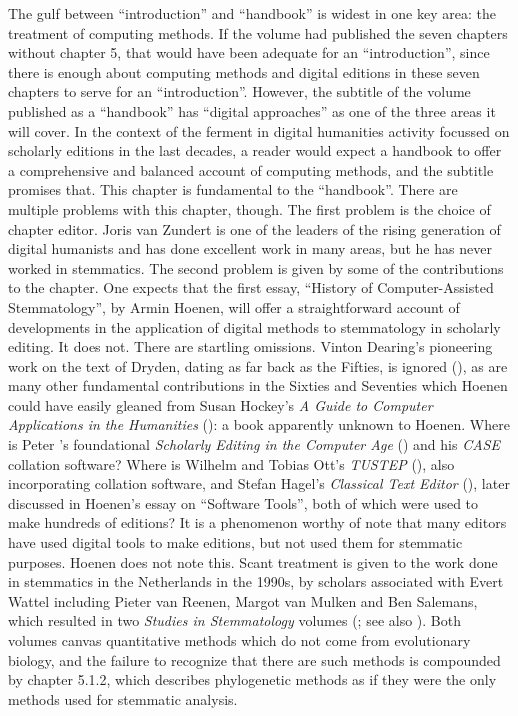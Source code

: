 \begin{review}
The gulf between ``introduction'' and ``handbook'' is widest in
one key area: the treatment of computing methods. If the volume had
published the seven chapters without chapter 5, that would have been
adequate for an ``introduction'', since there is enough about computing
methods and digital editions in these seven chapters to serve for an
``introduction''. However, the subtitle of the volume published as a
``handbook'' has ``digital approaches'' as one of the three areas it
will cover. In the context of the ferment in digital humanities activity
focussed on scholarly editions in the last decades, a reader would
expect a handbook to offer a comprehensive and balanced account of
computing methods, and the subtitle promises that. This chapter is
fundamental to the ``handbook''. There are multiple problems with this
chapter, though. The first problem is the choice of chapter editor.
Joris van Zundert is one of the leaders of the rising generation of
digital humanists and has done excellent work in many areas, but he has never worked in stemmatics. The
second problem is given by some of the contributions to the chapter. One
expects that the first essay, ``History of Computer-Assisted
Stemmatology'', by Armin Hoenen, will offer a straightforward account of
developments in the application of digital methods to stemmatology in
scholarly editing. It does not. There are startling omissions. Vinton
Dearing's pioneering work on the text of Dryden, dating as far back as
the Fifties, is ignored (\citeyear{dearing_methods_1962}), as are many other fundamental
contributions in the Sixties and Seventies which Hoenen could have
easily gleaned from Susan Hockey's \emph{A Guide to Computer
Applications in the Humanities} (\citeyear{hockey_guide_1980}): a book apparently unknown to
Hoenen. Where is Peter \citeauthor{shillingsburg_scholarly_1986}'s foundational \emph{Scholarly
Editing in the Computer Age} (\citeyear{shillingsburg_scholarly_1986}) and his \emph{CASE} collation
software? Where is Wilhelm and Tobias Ott's \emph{TUSTEP} (\citeyear{ott_tustep_2011}), also
incorporating collation software, and Stefan Hagel's \emph{Classical
Text Editor} (\citeyear{hagel_classical_1997}), later discussed in Hoenen's essay on ``Software
Tools'', both of which were used to make hundreds of editions? It is a
phenomenon worthy of note that many editors have used digital tools to
make editions, but not used them for stemmatic purposes. Hoenen does not
note this. Scant treatment is given to the work done in stemmatics in
the Netherlands in the 1990s, by scholars associated with Evert Wattel
including Pieter van Reenen, Margot van Mulken and Ben Salemans, which
resulted in two \emph{Studies in Stemmatology} volumes (\cite{reenen_studies_1996}; see also \cite{reenen_studies_2004}). Both volumes canvas
quantitative methods which do not come from evolutionary biology, and
the failure to recognize that there are such methods is compounded by
chapter 5.1.2, which describes phylogenetic methods as if they were the
only methods used for stemmatic analysis.


\end{review}
